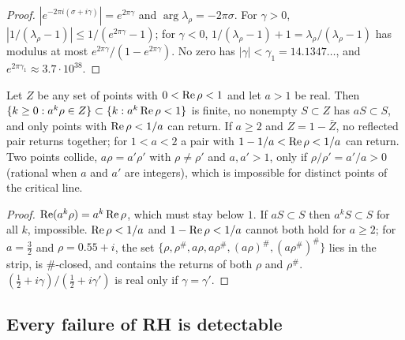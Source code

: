 \begin{proof}
$|e^{-2\pi i(\sigma+i\gamma)}|=e^{2\pi\gamma}$ and $\arg\lambda_\rho=-2\pi\sigma$. For $\gamma>0$, $|1/(\lambda_\rho-1)|\le1/(e^{2\pi\gamma}-1)$; for $\gamma<0$, $1/(\lambda_\rho-1)+1=\lambda_\rho/(\lambda_\rho-1)$ has modulus at most $e^{2\pi\gamma}/(1-e^{2\pi\gamma})$. No zero has $|\gamma|<\gamma_1=14.1347\ldots$, and $e^{2\pi\gamma_1}\approx3.7\cdot10^{38}$.
\end{proof}

\begin{lemma}\label{lem:escape}
Let $Z$ be any set of points with $0<\operatorname{Re}\rho<1$ and let $a>1$ be real. Then $\{k\ge0:a^k\rho\in Z\}\subset\{k:a^k\operatorname{Re}\rho<1\}$ is finite, no nonempty $S\subset Z$ has $aS\subset S$, and only points with $\operatorname{Re}\rho<1/a$ can return. If $a\ge2$ and $Z=1-\bar Z$, no reflected pair returns together; for $1<a<2$ a pair with $1-1/a<\operatorname{Re}\rho<1/a$ can return. Two points collide, $a\rho=a'\rho'$ with $\rho\ne\rho'$ and $a,a'>1$, only if $\rho/\rho'=a'/a>0$ (rational when $a$ and $a'$ are integers), which is impossible for distinct points of the critical line.
\end{lemma}

\begin{proof}
$\operatorname{Re}(a^k\rho)=a^k\operatorname{Re}\rho$, which must stay below $1$. If $aS\subset S$ then $a^kS\subset S$ for all $k$, impossible. $\operatorname{Re}\rho<1/a$ and $1-\operatorname{Re}\rho<1/a$ cannot both hold for $a\ge2$; for $a=\tfrac32$ and $\rho=0.55+i$, the set $\{\rho,\rho^\#,a\rho,a\rho^\#,(a\rho)^\#,(a\rho^\#)^\#\}$ lies in the strip, is $\#$-closed, and contains the returns of both $\rho$ and $\rho^\#$. $(\tfrac12+i\gamma)/(\tfrac12+i\gamma')$ is real only if $\gamma=\gamma'$.
\end{proof}

\subsection{Every failure of RH is detectable}

